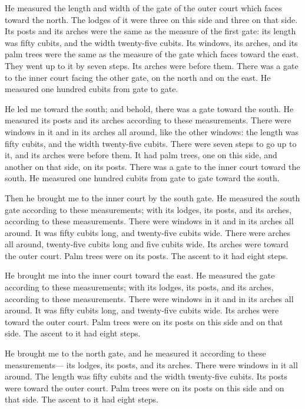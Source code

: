 He measured the length and width of the gate of the outer
court which faces toward the north.  The lodges of it were
three on this side and three on that side. Its posts and its arches were
the same as the measure of the first gate: its length was fifty cubits,
and the width twenty-five cubits.  Its windows, its arches,
and its palm trees were the same as the measure of the gate which faces
toward the east. They went up to it by seven steps. Its arches were
before them.  There was a gate to the inner court facing
the other gate, on the north and on the east. He measured one hundred
cubits from gate to gate.

 He led me toward the south; and behold, there was a gate
toward the south. He measured its posts and its arches according to
these measurements.  There were windows in it and in its
arches all around, like the other windows: the length was fifty cubits,
and the width twenty-five cubits.  There were seven steps
to go up to it, and its arches were before them. It had palm trees, one
on this side, and another on that side, on its posts. 
There was a gate to the inner court toward the south. He measured one
hundred cubits from gate to gate toward the south.

 Then he brought me to the inner court by the south gate.
He measured the south gate according to these measurements;
 with its lodges, its posts, and its arches, according to
these measurements. There were windows in it and in its arches all
around. It was fifty cubits long, and twenty-five cubits wide.
 There were arches all around, twenty-five cubits long and
five cubits wide.  Its arches were toward the outer court.
Palm trees were on its posts. The ascent to it had eight steps.

 He brought me into the inner court toward the east. He
measured the gate according to these measurements;  with
its lodges, its posts, and its arches, according to these measurements.
There were windows in it and in its arches all around. It was fifty
cubits long, and twenty-five cubits wide.  Its arches were
toward the outer court. Palm trees were on its posts on this side and on
that side. The ascent to it had eight steps.

 He brought me to the north gate, and he measured it
according to these measurements---  its lodges, its posts,
and its arches. There were windows in it all around. The length was
fifty cubits and the width twenty-five cubits.  Its posts
were toward the outer court. Palm trees were on its posts on this side
and on that side. The ascent to it had eight steps.


